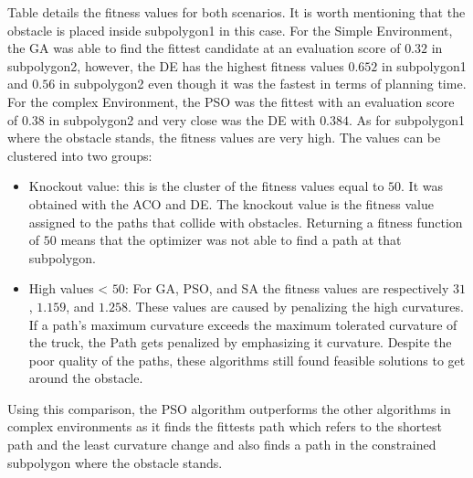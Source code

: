 Table  details the fitness values for both scenarios. It is worth mentioning
that the obstacle is placed inside subpolygon1 in this case.
For the Simple Environment, the GA was able to find the fittest candidate at an evaluation score of 
\(0.32\) in subpolygon2, however, the DE has the highest fitness values \(0.652\) in subpolygon1 and \(0.56\) in subpolygon2 
even though it was the fastest in terms of planning time.
For the complex Environment, the PSO was the fittest with an evaluation score of \(0.38\) in subpolygon2 and very 
close was the DE with \(0.384\). As for subpolygon1 where the obstacle stands, the fitness values are very high.
The values can be clustered into two groups:
\begin{itemize}
    \item Knockout value: this is the cluster of the fitness values equal to \(50\). It was obtained
    with the ACO and DE. The knockout value is the fitness value assigned to the paths that collide with obstacles.
    Returning a fitness function of \(50\) means that the optimizer was not able to find a path at that subpolygon.
    \item High values < \(50\): For GA, PSO, and SA the fitness values are respectively \(31\), \(1.159\), and \(1.258\).
    These values are caused by penalizing the high curvatures.
    If a path's maximum curvature exceeds the maximum tolerated curvature of the truck, the Path gets penalized by 
    emphasizing it curvature. Despite the poor quality of the paths, these algorithms still found feasible solutions 
    to get around the obstacle. 
\end{itemize}

Using this comparison, the PSO algorithm outperforms the other algorithms in complex environments as it 
finds the fittests path which refers to the shortest path and the least curvature change and also finds a path in 
the constrained subpolygon where the obstacle stands.

